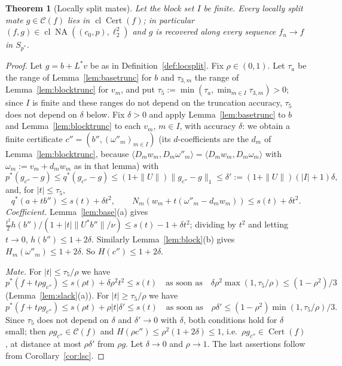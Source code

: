 \documentclass[10pt]{amsart}
\newtheorem{theorem}{Theorem}[section]
\theoremstyle{definition}
\theoremstyle{remark}
\newcommand{\NA}{\operatorname{NA}}
\newcommand{\Cset}{\mathcal C}
\newcommand{\Cert}{\operatorname{Cert}}
\newcommand{\cl}{\operatorname{cl}}
\newcommand{\ip}[2]{\langle #1,#2\rangle}
\begin{document}
\begin{theorem}[Locally split mates]\label{thm:locsplit}
Let the block set $I$ be finite.  Every locally split mate
$g\in\Cset(f)$ lies in $\cl\Cert(f)$; in particular $(f,g)\in
\cl\NA((c_0,p),\ell_2^2)$ and $g$ is recovered along every sequence
$f_n\to f$ in $S_{p^*}$.
\end{theorem}

\begin{proof}
Let $g=b+L^*v$ be as in Definition~\ref{def:locsplit}.  Fix $\rho\in(0,1)$.
Let $\tau_a$ be the range of Lemma~\ref{lem:basetrunc} for $b$ and
$\tau_{3,m}$ the range of Lemma~\ref{lem:blocktrunc} for $v_m$, and put
$\tau_5:=\min(\tau_a,\min_{m\in I}\tau_{3,m})>0$; since $I$ is finite and
these ranges do not depend on the truncation accuracy, $\tau_5$ does not
depend on $\delta$ below.  Fix $\delta>0$ and apply
Lemma~\ref{lem:basetrunc} to $b$ and Lemma~\ref{lem:blocktrunc} to each
$v_m$, $m\in I$, with accuracy $\delta$: we obtain a finite certificate
$c''=(b'',(\omega''_m)_{m\in I})$ \textup{(}its $d$-coefficients are the
$d_m$ of Lemma~\ref{lem:blocktrunc}, because
$\ip{D_mw_m}{D_m\omega''_m}=\ip{D_mw_m}{D_m\omega_m}$ with
$\omega_m:=v_m+d_mw_m$ as in that lemma\textup{)} with
\[
 p^*(g_{c''}-g)\le q^*(g_{c''}-g)\le(1+\|U\|)\|g_{c''}-g\|_1
 \le\delta':=(1+\|U\|)(|I|+1)\delta,
\]
and, for $|t|\le\tau_5$,
\[
 q^*(a+tb'')\le s(t)+\delta t^2,\qquad
 N_m(w_m+t(\omega''_m-d_mw_m))\le s(t)+\delta t^2 .
\]
\emph{Coefficient.}  Lemma~\ref{lem:base}(a) gives
$\frac{t^2}2h(b'')/(1+|t|\|U^*b''\|/\nu)\le s(t)-1+\delta t^2$; dividing
by $t^2$ and letting $t\to0$, $h(b'')\le1+2\delta$.  Similarly
Lemma~\ref{lem:block}(b) gives $H_m(\omega''_m)\le1+2\delta$.  So
$H(c'')\le1+2\delta$.

\emph{Mate.}  For $|t|\le\tau_5/\rho$ we have
\[
 p^*(f+t\rho g_{c''})\le s(\rho t)+\delta\rho^2t^2\le s(t)
 \quad\text{as soon as}\quad
 \delta\rho^2\max(1,\tau_5/\rho)\le(1-\rho^2)/3
\]
(Lemma~\ref{lem:slack}(a)).  For $|t|\ge\tau_5/\rho$ we have
\[
 p^*(f+t\rho g_{c''})\le s(\rho t)+\rho|t|\delta'\le s(t)
 \quad\text{as soon as}\quad
 \rho\delta'\le(1-\rho^2)\min(1,\tau_5/\rho)/3.
\]
Since $\tau_5$ does not depend on $\delta$ and $\delta'\to0$ with $\delta$,
both conditions hold for $\delta$ small; then $\rho g_{c''}\in\Cset(f)$ and $H(\rho c'')\le
\rho^2(1+2\delta)\le1$, i.e.\ $\rho g_{c''}\in\Cert(f)$, at distance at most
$\rho\delta'$ from $\rho g$.  Let $\delta\to0$ and $\rho\to1$.  The last
assertions follow from Corollary~\ref{cor:lsc}.
\end{proof}
\end{document}
